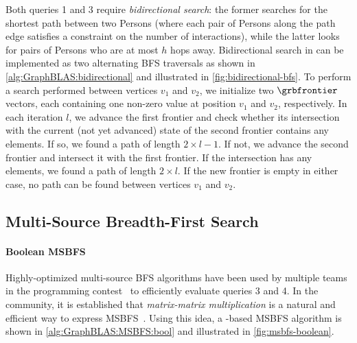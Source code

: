 Both queries 1 and 3 require \emph{bidirectional search}:
the former searches for the shortest path between two Persons (where each pair of Persons along the path edge satisfies a constraint on the number of interactions),
while the latter looks for pairs of Persons who are at most $h$ hops away.
Bidirectional search in \grb can be implemented as two alternating BFS traversals as shown in \autoref{alg:GraphBLAS:bidirectional} and illustrated in \autoref{fig:bidirectional-bfs}.
To perform a search performed between vertices $v_1$ and $v_2$, we initialize two $\grbfrontier$ vectors, each containing one non-zero value at position $v_1$ and $v_2$, respectively.
In each iteration $l$, we advance the first frontier and check whether its intersection with the current (not yet advanced) state of the second frontier contains any elements.
If so, we found a path of length $2 \times l - 1$.
If not, we advance the second frontier and intersect it with the first frontier.
If the intersection has any elements, we found a path of length $2 \times l$.
If the new frontier is empty in either case, no path can be found between vertices $v_1$ and $v_2$.


\subsection{Multi-Source Breadth-First Search}

\paragraph{Boolean MSBFS}
%
Highly-optimized multi-source BFS algorithms have been used by multiple teams in the programming contest~\cite{DBLP:journals/pvldb/ThenKCHPK0V14,DBLP:conf/edbt/KaufmannTK017} to efficiently evaluate queries 3 and 4.
In the \grb community, it is established that \emph{matrix-matrix multiplication} is a natural and efficient way to express MSBFS~\cite{DBLP:journals/corr/abs-1908-01407}.
Using this idea, a \grb-based MSBFS algorithm is shown in \autoref{alg:GraphBLAS:MSBFS:bool} and illustrated in \autoref{fig:msbfs-boolean}.

